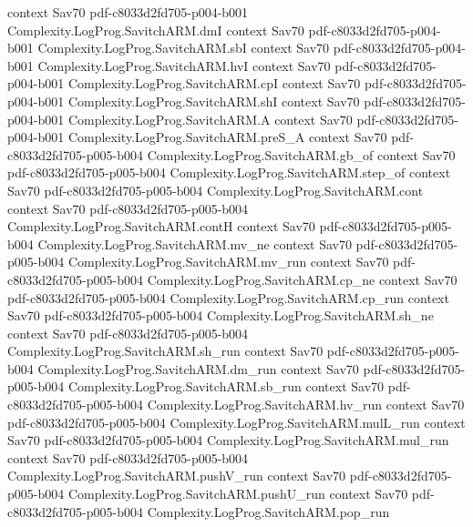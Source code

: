 \begin{theorem}
  {context}
  {Sav70}
  {pdf-c8033d2fd705-p004-b001}
\proofstep
  {Complexity.LogProg.SavitchARM.dmI}
  {context}
  {Sav70}
  {pdf-c8033d2fd705-p004-b001}
\proofstep
  {Complexity.LogProg.SavitchARM.sbI}
  {context}
  {Sav70}
  {pdf-c8033d2fd705-p004-b001}
\proofstep
  {Complexity.LogProg.SavitchARM.hvI}
  {context}
  {Sav70}
  {pdf-c8033d2fd705-p004-b001}
\proofstep
  {Complexity.LogProg.SavitchARM.cpI}
  {context}
  {Sav70}
  {pdf-c8033d2fd705-p004-b001}
\proofstep
  {Complexity.LogProg.SavitchARM.shI}
  {context}
  {Sav70}
  {pdf-c8033d2fd705-p004-b001}
\proofstep
  {Complexity.LogProg.SavitchARM.A}
  {context}
  {Sav70}
  {pdf-c8033d2fd705-p004-b001}
\proofstep
  {Complexity.LogProg.SavitchARM.preS_A}
  {context}
  {Sav70}
  {pdf-c8033d2fd705-p005-b004}
\proofstep
  {Complexity.LogProg.SavitchARM.gb_of}
  {context}
  {Sav70}
  {pdf-c8033d2fd705-p005-b004}
\proofstep
  {Complexity.LogProg.SavitchARM.step_of}
  {context}
  {Sav70}
  {pdf-c8033d2fd705-p005-b004}
\proofstep
  {Complexity.LogProg.SavitchARM.cont}
  {context}
  {Sav70}
  {pdf-c8033d2fd705-p005-b004}
\proofstep
  {Complexity.LogProg.SavitchARM.contH}
  {context}
  {Sav70}
  {pdf-c8033d2fd705-p005-b004}
\proofstep
  {Complexity.LogProg.SavitchARM.mv_ne}
  {context}
  {Sav70}
  {pdf-c8033d2fd705-p005-b004}
\proofstep
  {Complexity.LogProg.SavitchARM.mv_run}
  {context}
  {Sav70}
  {pdf-c8033d2fd705-p005-b004}
\proofstep
  {Complexity.LogProg.SavitchARM.cp_ne}
  {context}
  {Sav70}
  {pdf-c8033d2fd705-p005-b004}
\proofstep
  {Complexity.LogProg.SavitchARM.cp_run}
  {context}
  {Sav70}
  {pdf-c8033d2fd705-p005-b004}
\proofstep
  {Complexity.LogProg.SavitchARM.sh_ne}
  {context}
  {Sav70}
  {pdf-c8033d2fd705-p005-b004}
\proofstep
  {Complexity.LogProg.SavitchARM.sh_run}
  {context}
  {Sav70}
  {pdf-c8033d2fd705-p005-b004}
\proofstep
  {Complexity.LogProg.SavitchARM.dm_run}
  {context}
  {Sav70}
  {pdf-c8033d2fd705-p005-b004}
\proofstep
  {Complexity.LogProg.SavitchARM.sb_run}
  {context}
  {Sav70}
  {pdf-c8033d2fd705-p005-b004}
\proofstep
  {Complexity.LogProg.SavitchARM.hv_run}
  {context}
  {Sav70}
  {pdf-c8033d2fd705-p005-b004}
\proofstep
  {Complexity.LogProg.SavitchARM.mulL_run}
  {context}
  {Sav70}
  {pdf-c8033d2fd705-p005-b004}
\proofstep
  {Complexity.LogProg.SavitchARM.mul_run}
  {context}
  {Sav70}
  {pdf-c8033d2fd705-p005-b004}
\proofstep
  {Complexity.LogProg.SavitchARM.pushV_run}
  {context}
  {Sav70}
  {pdf-c8033d2fd705-p005-b004}
\proofstep
  {Complexity.LogProg.SavitchARM.pushU_run}
  {context}
  {Sav70}
  {pdf-c8033d2fd705-p005-b004}
\proofstep
  {Complexity.LogProg.SavitchARM.pop_run}

\end{theorem}
